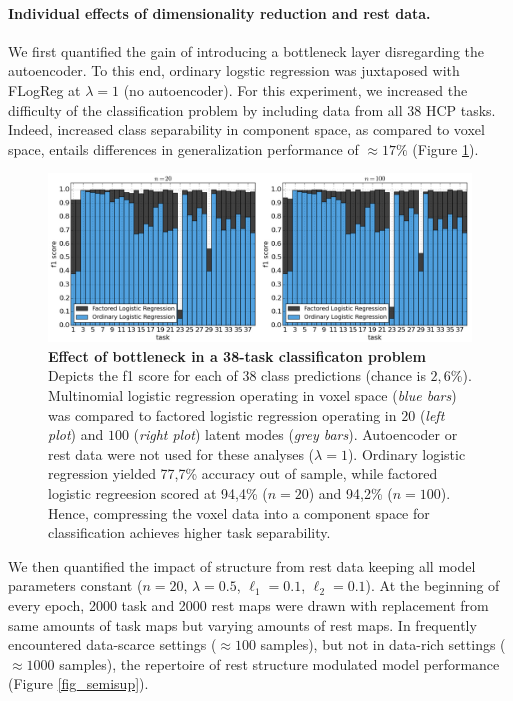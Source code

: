 \documentclass{article} %
\begin{document}
\paragraph{Individual effects of dimensionality reduction and rest data.}
We first quantified the gain of introducing a bottleneck layer
disregarding the autoencoder.
To this end, ordinary logstic regression was juxtaposed
with FLogReg  at $\lambda=1$ (no autoencoder).
For this experiment, we increased the difficulty of the classification problem
by including data from all 38 HCP tasks.
Indeed, increased class separability in component space,
as compared to voxel space, entails differences in
generalization performance of
$\approx{17\%}$ (Figure \ref{fig_dimred}).
\begin{figure}
\begin{centering}
\includegraphics[width=1.00\textwidth]{figures/accuracies.pdf}
\end{centering}
\vspace{-0.5cm}
\caption{\textbf{Effect of bottleneck in a 38-task classificaton problem}
Depicts the f1 score for each of 38 class predictions (chance is  $2,6\%$).
Multinomial logistic regression operating in voxel space (\textit{blue bars})
was compared to 
factored logistic regression operating in $20$
(\textit{left plot}) and $100$ (\textit{right plot})
latent modes (\textit{grey bars}).
Autoencoder or rest data were not used for these analyses
($\lambda=1$).
Ordinary logistic regression yielded 77,7\% accuracy out of sample, while
factored logistic regreesion scored at 94,4\% ($n=20$) and 94,2\% ($n=100$).
Hence, compressing the voxel data into a component space for classification
achieves higher task separability.
}
\label{fig_dimred}
\end{figure}

We then quantified the impact of structure from rest data keeping
all model parameters constant
($n=20$, $\lambda=0.5$, $\ell_1=0.1$, $\ell_2=0.1$).
At the beginning of every epoch,
2000 task and 2000 rest maps were drawn with replacement
from same amounts of task maps but varying amounts of rest maps.
In frequently encountered data-scarce settings ($\approx{100}$ samples),
but not in data-rich settings ($\approx{1000}$ samples),
the repertoire of rest structure modulated model performance
(Figure \ref{fig_semisup}).
\end{document}
